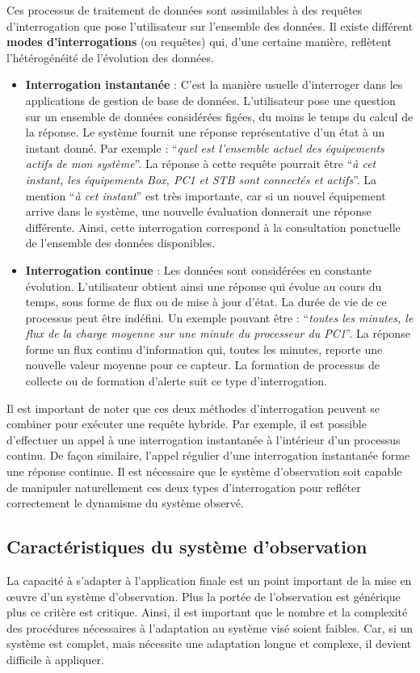 Ces processus de traitement de données sont assimilables à des requêtes d'interrogation que pose l'utilisateur sur l'ensemble des données. Il existe différent \textbf{modes d'interrogations} (ou requêtes) qui, d'une certaine manière, reflètent l'hétérogénéité de l'évolution des données.
\begin{itemize}
    \item \textbf{Interrogation instantanée} : C'est la manière usuelle d'interroger dans les applications de gestion de base de données. L'utilisateur pose une question sur un ensemble de données considérées figées, du moins le temps du calcul de la réponse. Le système fournit une réponse représentative d'un état à un instant donné. Par exemple : \enquote{\it quel est l'ensemble actuel des équipements actifs de mon système}. La réponse à cette requête pourrait être \enquote{\it à cet instant, les équipements Box, PC1 et STB sont connectés et actifs}. La mention \enquote{\it à cet instant} est très importante, car si un nouvel équipement arrive dans le système, une nouvelle évaluation donnerait une réponse différente. Ainsi, cette interrogation correspond à la consultation ponctuelle de l'ensemble des données disponibles.
    \item \textbf{Interrogation continue} : Les données sont considérées en constante évolution. L'utilisateur obtient ainsi une réponse qui évolue au cours du temps, sous forme de flux ou de mise à jour d'état. La durée de vie de ce processus peut être indéfini. Un exemple pouvant être : \enquote{\it toutes les minutes, le flux de la charge moyenne sur une minute du processeur du PC1}. La réponse forme un flux continu d'information qui, toutes les minutes, reporte une nouvelle valeur moyenne pour ce capteur. La formation de processus de collecte ou de formation d'alerte suit ce type d'interrogation.
\end{itemize}

Il est important de noter que ces deux méthodes d'interrogation peuvent se combiner pour exécuter une requête hybride. Par exemple, il est possible d'effectuer un appel à une interrogation instantanée à l'intérieur d'un processus continu. De façon similaire, l'appel régulier d'une interrogation instantanée forme une réponse continue. Il est nécessaire que le système d'observation soit capable de manipuler naturellement ces deux types d'interrogation pour refléter correctement le dynamisme du système observé.

\subsection{Caractéristiques du système d'observation}\label{sec:intro:problematique:monitoring}
La capacité à s'adapter à l'application finale est un point important de la mise en œuvre d'un système d'observation. Plus la portée de l'observation est générique plus ce critère est critique. Ainsi, il est important que le nombre et la complexité des procédures nécessaires à l'adaptation au système visé soient faibles. Car, si un système est complet, mais nécessite une adaptation longue et complexe, il devient difficile à appliquer.

